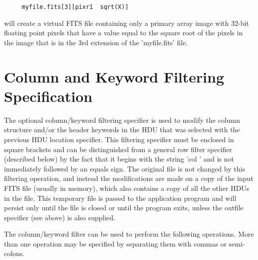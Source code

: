 \documentclass[11pt]{book}
\begin{document}
\begin{verbatim}
     myfile.fits[3][pixr1  sqrt(X)]
\end{verbatim}
will create a virtual FITS file containing only a primary array image
with 32-bit floating point pixels that have a value equal to the square
root of the pixels in the image that is in the 3rd extension
of the 'myfile.fits' file.




\section{Column and Keyword Filtering Specification}

The optional column/keyword filtering specifier is used to modify the
column structure and/or the header keywords in the HDU that was
selected with the previous HDU location specifier. This filtering
specifier must be enclosed in square brackets and can be distinguished
from a general row filter specifier (described below) by the fact that
it begins with the string 'col ' and is not immediately followed by an
equals sign.  The original file is not changed by this filtering
operation, and instead the modifications are made on a copy of the
input FITS file (usually in memory), which also contains a copy of all
the other HDUs in the file.  This temporary file is passed to the
application program and will persist only until the file is closed or
until the program exits, unless the outfile specifier (see above) is
also supplied.

The column/keyword filter can be used to perform the following
operations.  More than one operation may be specified by separating
them with commas or semi-colons.
\end{document}
